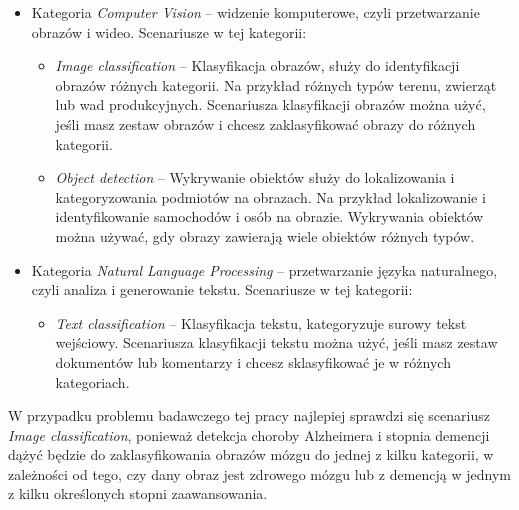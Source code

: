 \begin{itemize}
  \item Kategoria \emph{Computer Vision} -- widzenie komputerowe, czyli przetwarzanie obrazów i wideo.
        Scenariusze w tej kategorii:
        \begin{itemize}

          \item \emph{Image classification} -- Klasyfikacja obrazów, służy do identyfikacji obrazów różnych kategorii.
                Na przykład różnych typów terenu, zwierząt lub wad produkcyjnych.
                Scenariusza klasyfikacji obrazów można użyć, jeśli masz zestaw obrazów i chcesz zaklasyfikować obrazy do różnych kategorii.

          \item \emph{Object detection} -- Wykrywanie obiektów służy do lokalizowania i kategoryzowania podmiotów na obrazach.
          Na przykład lokalizowanie i identyfikowanie samochodów i osób na obrazie.
          Wykrywania obiektów można używać, gdy obrazy zawierają wiele obiektów różnych typów.

        \end{itemize}

  \item Kategoria \emph{Natural Language Processing} -- przetwarzanie języka naturalnego, czyli analiza i generowanie tekstu.
        Scenariusze w tej kategorii:

        \begin{itemize}

          \item \emph{Text classification} -- Klasyfikacja tekstu, kategoryzuje surowy tekst wejściowy.
          Scenariusza klasyfikacji tekstu można użyć, jeśli masz zestaw dokumentów lub komentarzy i chcesz sklasyfikować je w różnych kategoriach.

        \end{itemize}

\end{itemize}

W przypadku problemu badawczego tej pracy najlepiej sprawdzi się scenariusz \emph{Image classification}, ponieważ detekcja choroby Alzheimera i stopnia demencji dążyć będzie do zaklasyfikowania obrazów mózgu do jednej z kilku kategorii, w zależności od tego, czy dany obraz jest zdrowego mózgu lub z demencją w jednym z kilku określonych stopni zaawansowania.

